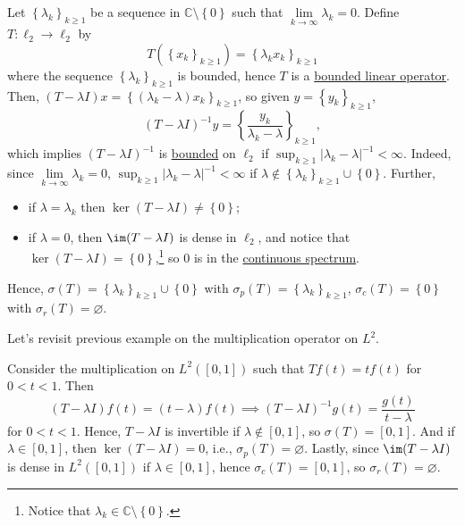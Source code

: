 \begin{eg}
	Let \(\left\{ \lambda _k \right\} _{k \geq 1}\) be a sequence in \(\mathbb{C} \setminus \left\{ 0 \right\} \) such that \(\lim\limits_{k \to \infty} \lambda _k = 0\). Define \(T\colon \ell _2 \to \ell _2\) by
	\[
		T(\left\{ x_k \right\} _{k\geq 1})= \left\{ \lambda_k x_k \right\} _{k\geq 1}
	\]
	where the sequence \(\left\{ \lambda _k \right\} _{k\geq 1}\) is bounded, hence \(T\) is a \hyperref[def:bounded-linear-op]{bounded linear operator}. Then, \((T-\lambda I) x = \left\{ (\lambda _k - \lambda )x_k \right\} _{k\geq 1}\), so given \(y = \left\{ y_k \right\} _{k\geq 1}\),
	\[
		(T-\lambda I)^{-1} y = \left\{ \frac{y_k}{\lambda _k - \lambda } \right\} _{k\geq 1},
	\]
	which implies \((T-\lambda I)^{-1} \) is \hyperref[rmk:bounded-op]{bounded} on \(\ell _2\) if \(\sup _{k\geq 1} \vert \lambda _k - \lambda \vert ^{-1} < \infty \). Indeed, since \(\lim\limits_{k \to \infty} \lambda _k = 0\), \(\sup _{k\geq 1} \vert \lambda _k - \lambda \vert ^{-1} < \infty\) if \(\lambda \notin \left\{ \lambda _k \right\}_{k\geq 1} \cup \left\{ 0 \right\}\). Further,
	\begin{itemize}
		\item if \(\lambda =\lambda _k\) then \(\ker(T - \lambda I) \neq \left\{ 0 \right\} \);
		\item if \(\lambda=0\), then \(\im(T - \lambda I)\) is dense in \(\ell _2\), and notice that \(\ker(T-\lambda I) = \left\{ 0 \right\} \),\footnote{Notice that \(\lambda _k \in \mathbb{C} \setminus \left\{ 0 \right\} \).} so \(0\) is in the \hyperref[def:continuous-spectrum]{continuous spectrum}.
	\end{itemize}

	Hence, \(\sigma (T) = \left\{ \lambda _k \right\}_{k\geq 1} \cup \left\{ 0 \right\}\) with \(\sigma _p(T) = \left\{ \lambda _k \right\}_{k\geq 1} \), \(\sigma _c(T) = \left\{ 0 \right\} \) with \(\sigma _r(T) = \varnothing \).
\end{eg}

Let's revisit previous example on the multiplication operator on \(L^2\).

\begin{eg}
	Consider the multiplication on \(L^2([0, 1])\) such that \(Tf(t) = tf(t)\) for \(0 < t < 1\). Then
	\[
		(T-\lambda I)f(t) = (t - \lambda )f(t) \implies (T-\lambda I)^{-1} g(t) = \frac{g(t)}{t - \lambda }
	\]
	for \(0 < t < 1\). Hence, \(T-\lambda I\) is invertible if \(\lambda \notin [0, 1]\), so \(\sigma (T) = [0, 1]\). And if \(\lambda \in [0, 1]\), then \(\ker(T - \lambda I) = 0\), i.e., \(\sigma _p(T)=\varnothing \). Lastly, since \(\im(T-\lambda I)\) is dense in \(L^2([0, 1])\) if \(\lambda \in [0, 1]\), hence \(\sigma _c(T) = [0, 1]\), so \(\sigma _r(T) = \varnothing \).
\end{eg}

